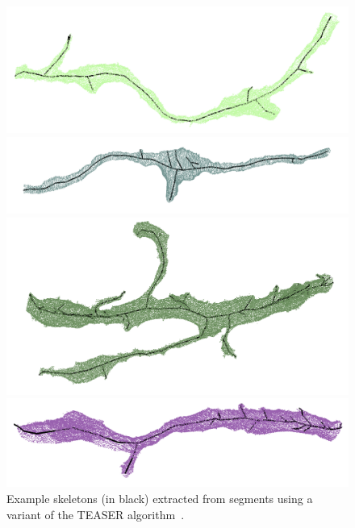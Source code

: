 \begin{figure}[t]
	\centering
	\begin{minipage}{0.45\linewidth}
		\includegraphics[width=\linewidth]{./figures/skeleton1.png}		
	\end{minipage}
	\hfill
	\begin{minipage}{0.45\linewidth}
		\includegraphics[width=\linewidth]{./figures/skeleton2.png}		
	\end{minipage}
	\begin{minipage}{0.45\linewidth}
		\includegraphics[width=\linewidth]{./figures/skeleton3.png}		
	\end{minipage}
	\hfill
	\begin{minipage}{0.45\linewidth}
		\includegraphics[width=\linewidth]{./figures/skeleton4.png}		
	\end{minipage}
	\caption{Example skeletons (in black) extracted from segments using a variant of the TEASER algorithm~\cite{sato2000teasar}.}
	\label{fig:skeletonization}
\end{figure}

